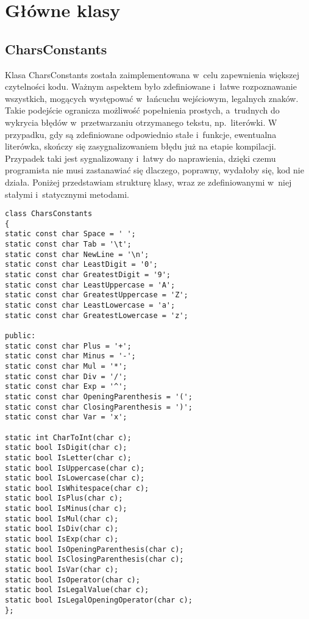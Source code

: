 \section{Główne klasy}

\subsection{CharsConstants}

Klasa CharsConstants została zaimplementowana w~celu zapewnienia większej czytelności kodu. Ważnym aspektem było zdefiniowane i~łatwe rozpoznawanie wszystkich, mogących występować w~łańcuchu wejściowym, legalnych znaków. Takie podejście ogranicza możliwość popełnienia prostych, a~trudnych do wykrycia błędów w~przetwarzaniu otrzymanego tekstu, np.\ literówki. W przypadku, gdy są zdefiniowane odpowiednio stałe i~funkcje, ewentualna literówka, skończy się zasygnalizowaniem błędu już na etapie kompilacji. Przypadek taki jest sygnalizowany i~łatwy do naprawienia, dzięki czemu programista nie musi zastanawiać się dlaczego, poprawny, wydałoby się, kod nie działa. Poniżej przedstawiam strukturę klasy, wraz ze zdefiniowanymi w~niej stałymi i~statycznymi metodami. 

\begin{lstlisting}
class CharsConstants
{
static const char Space = ' ';
static const char Tab = '\t';
static const char NewLine = '\n';
static const char LeastDigit = '0';
static const char GreatestDigit = '9';
static const char LeastUppercase = 'A';
static const char GreatestUppercase = 'Z';
static const char LeastLowercase = 'a';
static const char GreatestLowercase = 'z';

public:
static const char Plus = '+';
static const char Minus = '-';
static const char Mul = '*';
static const char Div = '/';
static const char Exp = '^';
static const char OpeningParenthesis = '(';
static const char ClosingParenthesis = ')';
static const char Var = 'x';

static int CharToInt(char c);
static bool IsDigit(char c);
static bool IsLetter(char c);
static bool IsUppercase(char c);
static bool IsLowercase(char c);
static bool IsWhitespace(char c);
static bool IsPlus(char c);
static bool IsMinus(char c);
static bool IsMul(char c);
static bool IsDiv(char c);
static bool IsExp(char c);
static bool IsOpeningParenthesis(char c);
static bool IsClosingParenthesis(char c);
static bool IsVar(char c);
static bool IsOperator(char c);
static bool IsLegalValue(char c);
static bool IsLegalOpeningOperator(char c);
};
\end{lstlisting}


